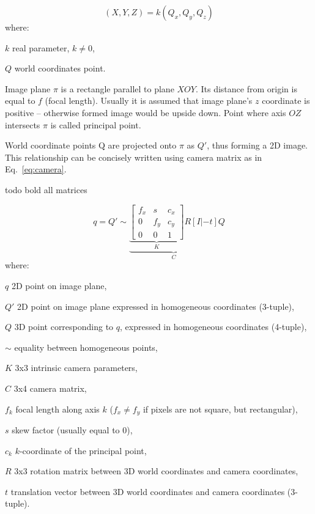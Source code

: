 \begin{equation}
(X, Y, Z) = k(Q_x, Q_y, Q_z)
\label{eq:homo}
\end{equation}
where:
\begin{eqwhere}[2cm]
	\item[$k$] real parameter, \(k \neq 0\),
	\item[$Q$] world coordinates point.
\end{eqwhere}

Image plane \(\pi\) is a rectangle parallel to plane \(XOY\). Its distance from origin is equal to \(f\) (focal length). Usually it is assumed that image plane's \(z\) coordinate is positive -- otherwise formed image would be upside down. Point where axis \(OZ\) intersects \(\pi\) is called principal point.

World coordinate points Q are projected onto \(\pi\) as \(Q'\), thus forming a 2D image. This relationship can be concisely written using camera matrix as in Eq.~\ref{eq:camera}.

todo bold all matrices

\begin{equation}
q = Q' \sim \underbrace{ \underbrace{  \begin{bmatrix}
		f_{x} & s & c_{x} \\ 
		0 & f_{y} & c_{y} \\ 
		0 & 0 & 1
	\end{bmatrix}
}_{K} R \left [ I | -t \right ] }_{C} Q
\label{eq:camera}
\end{equation}
where:
\begin{eqwhere}[2cm]
	\item[$q$] 2D point on image plane,
	\item[$Q'$] 2D point on image plane expressed in homogeneous coordinates (3-tuple),
	\item[$Q$] 3D point corresponding to $q$, expressed in homogeneous coordinates (4-tuple),
	\item[$\sim$] equality between homogeneous points,
	\item[$K$] 3x3 intrinsic camera parameters,
	\item[$C$] 3x4 camera matrix,
	\item[$f_{k}$] focal length along axis $k$ ($f_{x} \neq f_{y}$ if pixels are not square, but rectangular),
	\item[$s$] skew factor (usually equal to 0),
	\item[$c_{k}$] $k$-coordinate of the principal point,
	\item[$R$] 3x3 rotation matrix between 3D world coordinates and camera coordinates,
	\item[$t$] translation vector between 3D world coordinates and camera coordinates (3-tuple).
\end{eqwhere}

